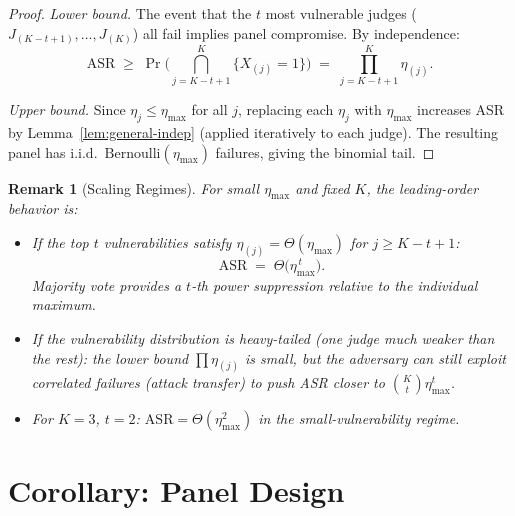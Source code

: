 \documentclass[11pt]{article}
\newtheorem*{remark}{Remark}
\begin{document}
\begin{proof}
\textit{Lower bound.}
The event that the $t$ most vulnerable judges ($J_{(K-t+1)}, \ldots, J_{(K)}$) all fail implies panel compromise. By independence:
\[
    \mathrm{ASR} \;\geq\; \Pr\!\bigl(\textstyle\bigcap_{j=K-t+1}^K \{X_{(j)} = 1\}\bigr) \;=\; \prod_{j=K-t+1}^{K} \eta_{(j)}.
\]

\textit{Upper bound.}
Since $\eta_j \leq \eta_{\max}$ for all $j$, replacing each $\eta_j$ with $\eta_{\max}$ increases ASR by Lemma~\ref{lem:general-indep} (applied iteratively to each judge). The resulting panel has i.i.d.\ $\mathrm{Bernoulli}(\eta_{\max})$ failures, giving the binomial tail.
\end{proof}

\begin{remark}[Scaling Regimes]
For small $\eta_{\max}$ and fixed $K$, the leading-order behavior is:
\begin{itemize}
    \item If the top $t$ vulnerabilities satisfy $\eta_{(j)} = \Theta(\eta_{\max})$ for $j \geq K{-}t{+}1$: \[ \mathrm{ASR} \;=\; \Theta\!\bigl(\eta_{\max}^{\,t}\bigr). \]
    Majority vote provides a $t$-th power suppression relative to the individual maximum.
    \item If the vulnerability distribution is \emph{heavy-tailed} (one judge much weaker than the rest): the lower bound $\prod \eta_{(j)}$ is small, but the adversary can still exploit correlated failures (attack transfer) to push ASR closer to $\binom{K}{t}\eta_{\max}^t$.
    \item For $K=3$, $t=2$: $\mathrm{ASR} = \Theta(\eta_{\max}^2)$ in the small-vulnerability regime.
\end{itemize}
\end{remark}


\section{Corollary: Panel Design}
\end{document}
